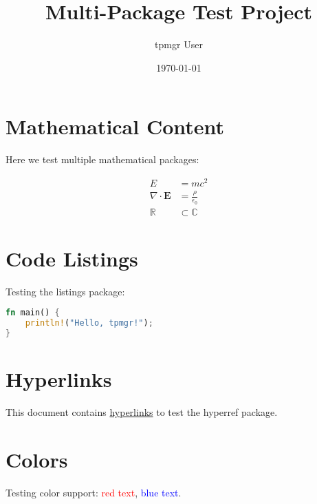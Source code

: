 \documentclass{article}
\title{Multi-Package Test Project}
\author{tpmgr User}
\date{\today}
\begin{document}
\maketitle

\section{Mathematical Content}
Here we test multiple mathematical packages:

\begin{align}
    E &= mc^2 \\
    \nabla \cdot \mathbf{E} &= \frac{\rho}{\epsilon_0} \\
    \mathbb{R} &\subset \mathbb{C}
\end{align}

\section{Code Listings}
Testing the listings package:

\begin{lstlisting}[language=Rust, backgroundcolor=\color{gray!10}]
fn main() {
    println!("Hello, tpmgr!");
}
\end{lstlisting}

\section{Hyperlinks}
This document contains \href{https://ctan.org}{hyperlinks} to test the hyperref package.

\section{Colors}
Testing color support: \textcolor{red}{red text}, \textcolor{blue}{blue text}.
\end{document}
